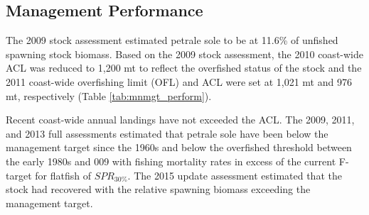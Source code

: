 \documentclass[12pt,]{article}
\begin{document}
\FloatBarrier

\subsection*{Management Performance}\label{management-performance}

The 2009 stock assessment estimated petrale sole to be at 11.6\% of
unfished spawning stock biomass. Based on the 2009 stock assessment, the
2010 coast-wide ACL was reduced to 1,200 mt to reflect the overfished
status of the stock and the 2011 coast-wide overfishing limit (OFL) and
ACL were set at 1,021 mt and 976 mt, respectively (Table
\ref{tab:mnmgt_perform}).

Recent coast-wide annual landings have not exceeded the ACL. The 2009,
2011, and 2013 full assessments estimated that petrale sole have been
below the management target since the 1960s and below the overfished
threshold between the early 1980s and 009 with fishing mortality rates
in excess of the current F-target for flatfish of \(SPR_{30\%}\). The
2015 update assessment estimated that the stock had recovered with the
relative spawning biomass exceeding the management target.

\begin{table}[ht]
\centering
\caption{Recent trend in total catch and  
                              landings (mt) relative to the management guidelines. 
                              Estimated total catch reflect the landings 
                              plus the model estimated discarded biomass based on discard rate data.} 
\label{tab:mnmgt_perform}
\end{table}
\end{document}
